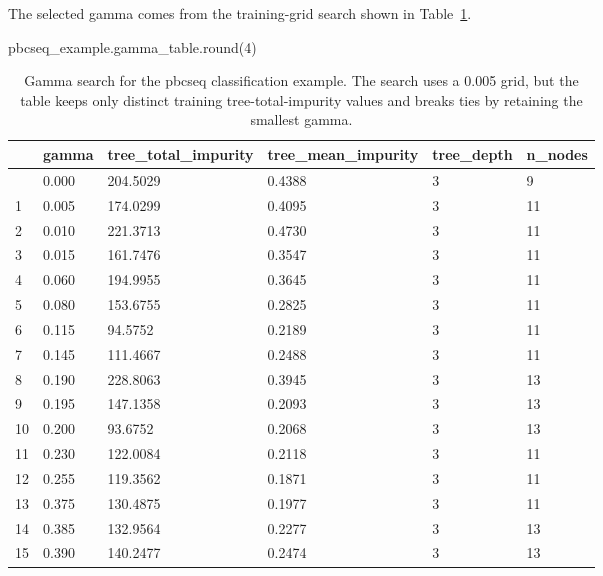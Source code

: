 \documentclass[
  letterpaper,
  DIV=11,
  numbers=noendperiod]{scrartcl}
\newenvironment{Shaded}{\begin{snugshade}}{\end{snugshade}}
\newcommand{\BuiltInTok}[1]{\textcolor[rgb]{0.00,0.23,0.31}{#1}}
\newcommand{\DecValTok}[1]{\textcolor[rgb]{0.68,0.00,0.00}{#1}}
\newcommand{\NormalTok}[1]{\textcolor[rgb]{0.00,0.23,0.31}{#1}}
\begin{document}
The selected gamma comes from the training-grid search shown in
Table~\ref{tbl-pbcseq-gamma-search}.

\begin{Shaded}
\begin{Highlighting}[]
\NormalTok{pbcseq\_example.gamma\_table.}\BuiltInTok{round}\NormalTok{(}\DecValTok{4}\NormalTok{)}
\end{Highlighting}
\end{Shaded}

\begin{longtable}[]{@{}llllll@{}}

\caption{\label{tbl-pbcseq-gamma-search}Gamma search for the pbcseq
classification example. The search uses a 0.005 grid, but the table
keeps only distinct training tree-total-impurity values and breaks ties
by retaining the smallest gamma.}

\tabularnewline

\toprule\noalign{}
& gamma & tree\_total\_impurity & tree\_mean\_impurity & tree\_depth &
n\_nodes \\
\midrule\noalign{}
\endhead
\bottomrule\noalign{}
\endlastfoot
0 & 0.000 & 204.5029 & 0.4388 & 3 & 9 \\
1 & 0.005 & 174.0299 & 0.4095 & 3 & 11 \\
2 & 0.010 & 221.3713 & 0.4730 & 3 & 11 \\
3 & 0.015 & 161.7476 & 0.3547 & 3 & 11 \\
4 & 0.060 & 194.9955 & 0.3645 & 3 & 11 \\
5 & 0.080 & 153.6755 & 0.2825 & 3 & 11 \\
6 & 0.115 & 94.5752 & 0.2189 & 3 & 11 \\
7 & 0.145 & 111.4667 & 0.2488 & 3 & 11 \\
8 & 0.190 & 228.8063 & 0.3945 & 3 & 13 \\
9 & 0.195 & 147.1358 & 0.2093 & 3 & 13 \\
10 & 0.200 & 93.6752 & 0.2068 & 3 & 13 \\
11 & 0.230 & 122.0084 & 0.2118 & 3 & 11 \\
12 & 0.255 & 119.3562 & 0.1871 & 3 & 11 \\
13 & 0.375 & 130.4875 & 0.1977 & 3 & 11 \\
14 & 0.385 & 132.9564 & 0.2277 & 3 & 13 \\
15 & 0.390 & 140.2477 & 0.2474 & 3 & 13 \\

\end{longtable}
\end{document}
